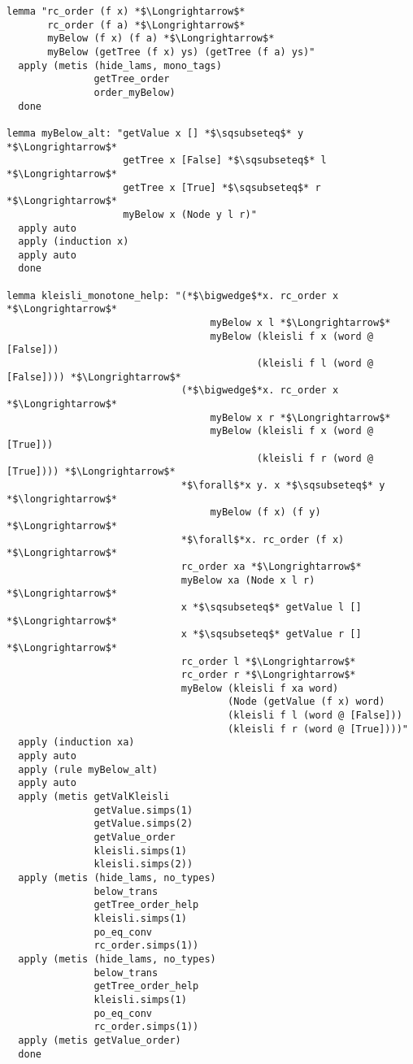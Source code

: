 \begin{lstlisting}[language=Isabelle]
lemma "rc_order (f x) *$\Longrightarrow$* 
       rc_order (f a) *$\Longrightarrow$* 
       myBelow (f x) (f a) *$\Longrightarrow$* 
       myBelow (getTree (f x) ys) (getTree (f a) ys)"
  apply (metis (hide_lams, mono_tags) 
               getTree_order 
               order_myBelow)
  done

lemma myBelow_alt: "getValue x [] *$\sqsubseteq$* y *$\Longrightarrow$* 
                    getTree x [False] *$\sqsubseteq$* l *$\Longrightarrow$* 
                    getTree x [True] *$\sqsubseteq$* r *$\Longrightarrow$* 
                    myBelow x (Node y l r)"
  apply auto
  apply (induction x)
  apply auto
  done

lemma kleisli_monotone_help: "(*$\bigwedge$*x. rc_order x *$\Longrightarrow$*
                                   myBelow x l *$\Longrightarrow$*
                                   myBelow (kleisli f x (word @ [False])) 
                                           (kleisli f l (word @ [False]))) *$\Longrightarrow$*
                              (*$\bigwedge$*x. rc_order x *$\Longrightarrow$*
                                   myBelow x r *$\Longrightarrow$*
                                   myBelow (kleisli f x (word @ [True])) 
                                           (kleisli f r (word @ [True]))) *$\Longrightarrow$*
                              *$\forall$*x y. x *$\sqsubseteq$* y *$\longrightarrow$* 
                                   myBelow (f x) (f y) *$\Longrightarrow$*
                              *$\forall$*x. rc_order (f x) *$\Longrightarrow$*
                              rc_order xa *$\Longrightarrow$*
                              myBelow xa (Node x l r) *$\Longrightarrow$*
                              x *$\sqsubseteq$* getValue l [] *$\Longrightarrow$*
                              x *$\sqsubseteq$* getValue r [] *$\Longrightarrow$*
                              rc_order l *$\Longrightarrow$*
                              rc_order r *$\Longrightarrow$*
                              myBelow (kleisli f xa word)
                                      (Node (getValue (f x) word) 
                                      (kleisli f l (word @ [False]))
                                      (kleisli f r (word @ [True])))"
  apply (induction xa)
  apply auto
  apply (rule myBelow_alt)
  apply auto
  apply (metis getValKleisli 
               getValue.simps(1) 
               getValue.simps(2) 
               getValue_order 
               kleisli.simps(1) 
               kleisli.simps(2))
  apply (metis (hide_lams, no_types) 
               below_trans 
               getTree_order_help 
               kleisli.simps(1) 
               po_eq_conv 
               rc_order.simps(1))
  apply (metis (hide_lams, no_types) 
               below_trans 
               getTree_order_help 
               kleisli.simps(1) 
               po_eq_conv 
               rc_order.simps(1))
  apply (metis getValue_order)
  done


\end{lstlisting}
